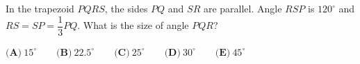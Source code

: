 In the trapezoid $PQRS$, the sides $PQ$ and $SR$ are parallel. Angle $RSP$ is $120^\circ$ and $RS=SP=\dfrac{1}{3}PQ$. What is the size of angle $PQR$?

$\textbf{(A)}\ 15^\circ\qquad\textbf{(B)}\ 22.5^\circ\qquad\textbf{(C)}\ 25^\circ\qquad\textbf{(D)}\ 30^\circ\qquad\textbf{(E)}\ 45^\circ$
